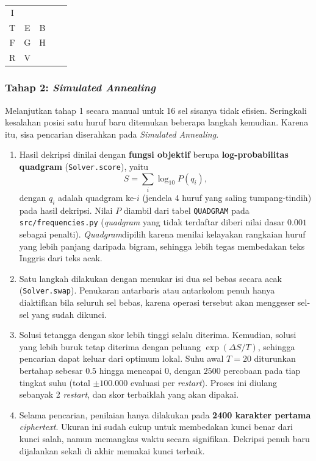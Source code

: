 \begin{center}
  \begin{tabular}{|c|c|c|c|c|}
    \hline
      &   &   &   &   \\
    \hline
    I &   &   &   &   \\
    \hline
    T & E & B &   &   \\
    \hline
    F & G & H &   &   \\
    \hline
    R & V &   &   &   \\
    \hline
  \end{tabular}
\end{center}

\subsubsection*{Tahap 2: \textit{Simulated Annealing}}

Melanjutkan tahap 1 secara manual untuk 16 sel sisanya tidak efisien. Seringkali kesalahan posisi satu huruf
baru ditemukan beberapa langkah kemudian. Karena itu, sisa pencarian diserahkan pada \textit{Simulated Annealing}.

\begin{enumerate}
  \item Hasil dekripsi dinilai dengan \textbf{fungsi objektif} berupa \textbf{log-probabilitas quadgram}
  (\texttt{Solver.score}), yaitu
  \[
    S = \sum_{i} \log_{10} P(q_i),
  \]
  dengan $q_i$ adalah quadgram ke-$i$ (jendela 4 huruf yang saling tumpang-tindih) pada hasil dekripsi.
  Nilai $P$ diambil dari tabel \texttt{QUADGRAM} pada \texttt{src/frequencies.py} (\textit{quadgram} yang tidak
  terdaftar diberi nilai dasar $0.001$ sebagai penalti). \textit{Quadgram}dipilih karena menilai kelayakan
  rangkaian huruf yang lebih panjang daripada bigram, sehingga lebih tegas membedakan teks Inggris dari
  teks acak.

  \item Satu langkah dilakukan dengan menukar isi dua sel bebas secara acak
  (\texttt{Solver.swap}). Penukaran antarbaris atau antarkolom penuh hanya diaktifkan bila seluruh sel
  bebas, karena operasi tersebut akan menggeser sel-sel yang sudah dikunci.

  \item Solusi tetangga dengan skor lebih tinggi selalu diterima. Kemudian, solusi yang lebih buruk tetap 
  diterima dengan peluang $\exp(\Delta S / T)$, sehingga pencarian dapat keluar
  dari optimum lokal. Suhu awal $T = 20$ diturunkan bertahap sebesar $0.5$ hingga mencapai $0$, dengan
  $2500$ percobaan pada tiap tingkat suhu (total $\pm 100.000$ evaluasi per \textit{restart}). Proses ini
  diulang sebanyak 2 \textit{restart}, dan skor terbaiklah yang akan dipakai.

  \item Selama pencarian, penilaian hanya dilakukan pada \textbf{2400 karakter pertama} \textit{ciphertext}. 
  Ukuran ini sudah cukup untuk membedakan kunci benar dari kunci salah,
  namun memangkas waktu secara signifikan. Dekripsi penuh baru dijalankan sekali di akhir
  memakai kunci terbaik.
\end{enumerate}

